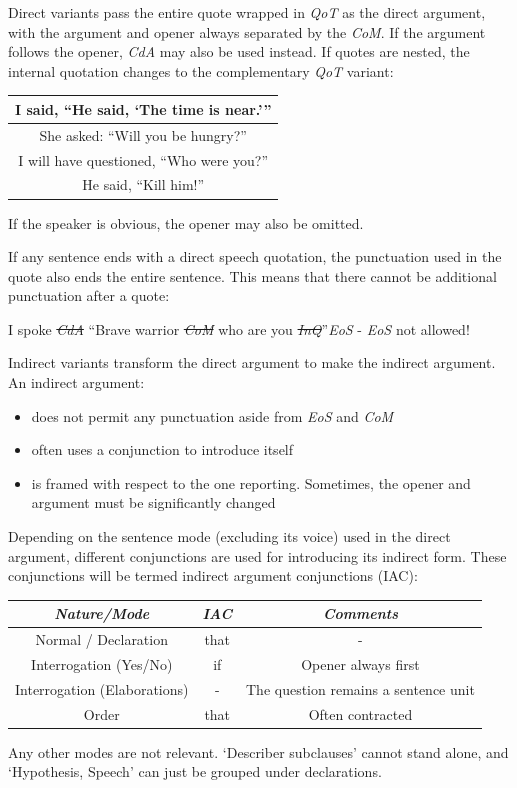 Direct variants pass the entire quote wrapped in  \textit{QoT} as the direct argument, with the argument and opener always separated  by the \textit{CoM}. If the argument follows the opener,  \textit{CdA} may also be used instead. If quotes are nested, the internal quotation changes to the complementary \textit{QoT} variant:
\begin{example}
    \begin{tabular}{c}
    I said, \enquote{He said, \enquote{The time is near.}}\\\hline She asked: \enquote{Will you be hungry?}\\\hline I will have questioned, \enquote{Who were you?}
    \\\hline He said, \enquote{Kill him!}
    \end{tabular}
\end{example}
If the speaker is obvious, the opener may also be omitted. 

If any sentence ends with a direct speech quotation, the punctuation used in the quote also ends the entire sentence. This means that there cannot be additional punctuation after a quote:
\begin{example}
    I spoke \sout{\textit{CdA}} \enquote{Brave warrior \sout{\textit{CoM}} who are you \sout{\textit{InQ}}}\textit{EoS} - \textit{EoS} not allowed!
\end{example}

Indirect variants transform the direct  argument to make the indirect argument. An indirect argument:
\begin{itemize}
    \item does not permit any punctuation  aside from  \textit{EoS} and \textit{CoM}
    \item often uses a conjunction  to introduce itself 
    \item is framed with respect to the one reporting. Sometimes, the opener and argument must be significantly changed
\end{itemize}
Depending on the sentence mode (excluding its voice) used in the direct argument, different conjunctions are used for introducing its indirect form. These conjunctions will be termed indirect argument conjunctions (IAC):
\begin{setdef}
    \begin{tabular}{c|c|c}
        \textit{Nature/Mode} & \textit{IAC} & \textit{Comments}\\\hline
        Normal / Declaration & that & -\\\hline
        Interrogation (Yes/No) & if & Opener always first\\\hline
        Interrogation (Elaborations) & - & The question remains a sentence unit\\\hline
        Order & that & Often contracted 
    \end{tabular}
\end{setdef}
Any other modes are not relevant. `Describer subclauses' cannot stand alone, and `Hypothesis, Speech' can just be grouped under declarations.

